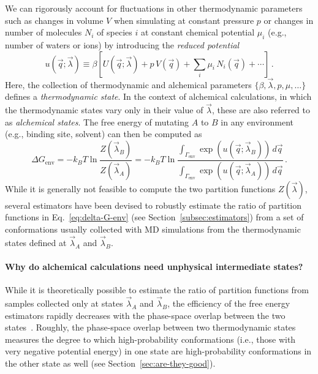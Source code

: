 \documentclass[9pt,bestpractices]{livecoms}
\begin{document}
We can rigorously account for fluctuations in other thermodynamic parameters such as changes in volume $V$ when simulating at constant pressure $p$ or changes in number of molecules $N_i$ of species $i$ at constant chemical potential $\mu_i$ (e.g., number of waters or ions) by introducing the \textit{reduced potential}~\cite{shirts2008statisticallya}
\begin{equation}\label{eq:reduced-potential}
u(\vec{q};\vec{\lambda}) \equiv \beta \left[ U(\vec{q};\vec{\lambda}) + p \, V(\vec{q}) + \sum_i \mu_i \, N_i(\vec{q}) + \cdots \right] \, .
\end{equation}
Here, the collection of thermodynamic and alchemical parameters $\{\beta, \vec{\lambda}, p, \mu, \ldots\}$ defines a \emph{thermodynamic state}.
In the context of alchemical calculations, in which the thermodynamic states vary only in their value of $\vec{\lambda}$, these are also referred to as \emph{alchemical states}.
The free energy of mutating $A$ to $B$ in any environment (e.g., binding site, solvent) can then be computed as
\begin{equation}\label{eq:delta-G-env}
    \Delta G_{\mathrm{env}} = - k_BT \ln \frac{Z(\vec{\lambda}_B)}{Z(\vec{\lambda}_A)} = - k_BT \ln \frac{\int_{\Gamma_{\mathrm{env}}} \exp\left( u(\vec{q}; \vec{\lambda}_B) \right) \, d\vec{q}}{\int_{\Gamma_{\mathrm{env}}} \exp\left( u(\vec{q}; \vec{\lambda}_A) \right) \, d\vec{q}} \, .
\end{equation}
While it is generally not feasible to compute the two partition functions $Z(\vec{\lambda})$, several estimators have been devised to robustly estimate the ratio of partition functions in Eq.~\ref{eq:delta-G-env} (see Section~\ref{subsec:estimators}) from a set of conformations usually collected with MD simulations from the thermodynamic states defined at $\vec{\lambda}_A$ and $\vec{\lambda}_B$.

\paragraph{Why do alchemical calculations need unphysical intermediate states?}
While it is theoretically possible to estimate the ratio of partition functions from samples collected only at states $\vec{\lambda}_A$ and $\vec{\lambda}_B$, the efficiency of the free energy estimators rapidly decreases with the phase-space overlap between the two states~\cite{wu2005phasespaceb,wu2005phasespacec}.
Roughly, the phase-space overlap between two thermodynamic states measures the degree to which high-probability conformations (i.e., those with very negative potential energy) in one state are high-probability conformations in the other state as well (see Section~\ref{sec:are-they-good}).
\end{document}
